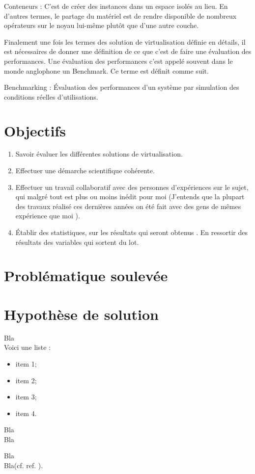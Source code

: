 \begin{mydef}
Conteneurs : C'est de créer des instances dans un espace isolés au lieu. En d'autres termes, le partage du matériel est de rendre disponible de nombreux opérateurs sur le noyau lui-même plutôt que d'une autre couche. 
\end{mydef}
Finalement une fois les termes des solution de virtualisation définie en détails, il est nécessaires de donner une définition de ce que c'est de faire une évaluation des performances. Une évaluation des performances c'est appelé souvent dans le monde anglophone un Benchmark. Ce terme est définit comme suit.
\begin{mydef}
Benchmarking : Évaluation des performances d'un système par simulation des conditions réelles d'utilisations. 
\end{mydef}
\newpage
\section{Objectifs}
\begin{enumerate}
	\item Savoir évaluer les différentes solutions de virtualisation. 	
	\item Effectuer une démarche scientifique cohérente.
	\item Effectuer un travail collaboratif avec des personnes d’expériences sur le sujet, qui malgré tout est plus ou moins inédit pour moi (J’entends que la plupart des travaux réalisé ces dernières années on été fait avec des gens de mêmes expérience que moi ).
	\item Établir des statistiques, sur les résultats qui seront obtenus . En ressortir des résultats des variables qui sortent du lot.
\end{enumerate}
\section{Problématique soulevée}

\begin{center} 
\end{center}

\section{Hypothèse de solution}

Bla\\

Voici une liste :
\begin{itemize}
\item item 1;
\item item 2;
\item item 3;
\item item 4.
\end{itemize}

Bla\\

Bla

Bla\footnotemark\\

Bla(cf. ref. \cite{cite6}).

